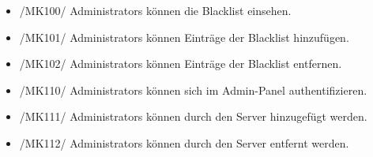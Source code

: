 \begin{itemize}
\begin{itemize}
            \item{/MK93/} \label{/MK93/}Welche Nummer hat der Raum? \hyperref[/FA20/]{/FA20/}
            \item{/MK94/} \label{/MK94/}Welche \Glspl{Alias} hat das Gebäude/der Raum? \hyperref[/FA80/]{/FA80/}
        \end{itemize}
    \item{/MK100/} \label{/MK100/}\Glspl{Administrator} können die \Gls{Blacklist} einsehen.
    \item{/MK101/} \label{/MK101/}\Glspl{Administrator} können Einträge der \Gls{Blacklist} hinzufügen.
    \item{/MK102/} \label{/MK102/}\Glspl{Administrator} können Einträge der \Gls{Blacklist} entfernen.
    \item{/MK110/} \label{/MK110/}\Glspl{Administrator} können sich im \Gls{Admin-Panel} authentifizieren.
    \item{/MK111/} \label{/MK111/}\Glspl{Administrator} können durch den \Gls{Server} hinzugefügt werden.
    \item{/MK112/} \label{/MK112/}\Glspl{Administrator} können durch den \Gls{Server} entfernt werden.

\end{itemize}
